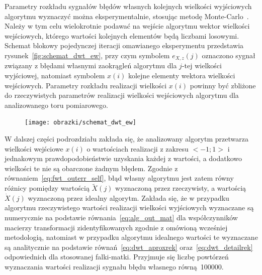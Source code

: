 Parametry rozkładu sygnałów błędów własnych kolejnych wielkości wyjściowych algorytmu wyznaczyć można eksperymentalnie, stosując metodę Monte-Carlo~\cite{jcgm_montecarlo}. Należy w tym celu wielokrotnie podawać na wejście algorytmu wektor wielkości wejściowych, którego wartości kolejnych elementów będą liczbami losowymi. Schemat blokowy pojedynczej iteracji omawianego eksperymentu przedstawia rysunek~\ref{fig:schemat_dwt_ew}, przy czym symbolem $e_{X,z}(j)$ oznaczono sygnał związany z błędami własnymi zaokrągleń algorytmu dla $j$-tej wielkości wyjściowej, natomiast symbolem $x(i)$ kolejne elementy wektora wielkości wejściowych. Parametry rozkładu realizacji wielkości $x(i)$ powinny być zbliżone do rzeczywistych parametrów realizacji wielkości wejściowych algorytmu dla analizowanego toru pomiarowego.

\begin{figure}[htb!]
\begin{center}
\texttt{[image: obrazki/schemat\_dwt\_ew]}
\end{center}
\end{figure}

W dalszej części podrozdziału zakłada się, że analizowany algorytm przetwarza wielkości wejściowe $x(i)$ o wartościach realizacji z zakresu $<-1;1>$ i jednakowym prawdopodobieństwie uzyskania każdej z wartości, a dodatkowo wielkości te nie są obarczone żadnym błędem. Zgodnie z równaniem~\eqref{eq:fwt_outerr_self}, błąd własny algorytmu jest zatem równy różnicy pomiędzy wartością $\tilde{X}(j)$ wyznaczoną przez rzeczywisty, a wartością $\dot{X}(j)$ wyznaczoną przez idealny algorytm. Zakłada się, że w przypadku algorytmu rzeczywistego wartości realizacji wielkości wyjściowych wyznaczane są numerycznie na podstawie równania~\eqref{eq:alg_out_mat} dla współczynników macierzy transformacji zidentyfikowanych zgodnie z omówioną wcześniej metodologią, natomiast w przypadku algorytmu idealnego wartości te wyznaczane są analitycznie na podstawie równań~\eqref{eq:dwt_aproxrek} oraz~\eqref{eq:dwt_detailrek} odpowiednich dla stosowanej falki-matki. Przyjmuje się liczbę powtórzeń wyznaczania wartości realizacji sygnału błędu własnego równą~\num{100000}.

